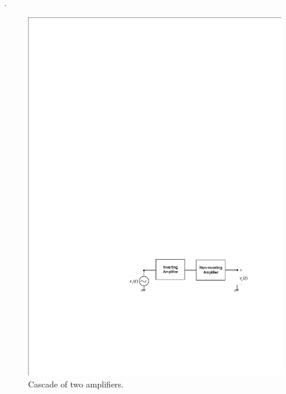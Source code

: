 \documentclass[11pt]{article}
\begin{document}
\begin{question}

    .

    \begin{figure}[H]
        \centering
        \includegraphics[scale=1.2,angle=0]{Fig/cir5.pdf}
        \caption{Cascade of two amplifiers.} \label{fig:cir5}
    \end{figure}


\end{question}
\end{document}
